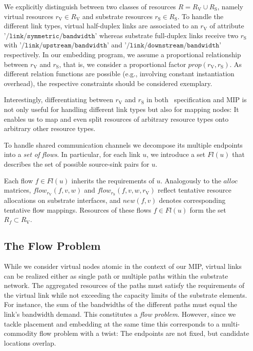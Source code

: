 \documentclass[conference,10pt]{IEEEtran}
\newcommand{\CloudNet}{\text{CloudNet}}
\newcommand{\mrm}{\mathrm}
\begin{document}
We explicitly distinguish between two classes
of resources $R=R_\mrm{V}\cup R_\mrm{S}$, namely virtual
resources $r_\mrm{V}\in R_\mrm{V}$ and substrate resources
$r_\mrm{S} \in R_\mrm{S}$.
To handle the different link types, virtual half-duplex links are associated to an $r_\mrm{V}$ of attribute
$\texttt{'/link}$$\texttt{/symmetric}$$\texttt{/bandwidth'}$
whereas substrate full-duplex links receive two $r_\mrm{S}$ with
$\texttt{'/link}$$\texttt{/upstream}$$\texttt{/bandwidth'}$ and
$\texttt{'/link}$$\texttt{/downstream}$$\texttt{/bandwidth'}$ respectively.
In our embedding program, we
assume a proportional relationship between $r_\mrm{V}$ and $r_\mrm{S}$, that is,
we consider a proportional factor $prop(r_\mrm{V},r_\mrm{S})$.
As different relation functions are possible (e.g., involving constant instantiation overhead), the respective constraints should be considered exemplary.

Interestingly, differentiating between $r_\mrm{V}$ and $r_\mrm{S}$ in both
\CloudNet\ specification and MIP is not only useful for
handling different link types but also for mapping nodes:
It enables us to map and even split resources of arbitrary resource types onto arbitrary other resource types.

To handle shared communication
channels we decompose its multiple endpoints into a \emph{set of
flows}. In particular, for each link $u$, we introduce a set $Fl(u)$
that describes the set of possible source-sink pairs for $u$.

Each flow $f\in Fl(u)$ inherits the requirements of $u$.
Analogously to the $alloc$ matrices, $flow_{r_\mrm{V}}(f,v,w)$ and $flow_{r_\mrm{S}}(f,v,w,r_\mrm{V})$ reflect tentative resource allocations on substrate interfaces,
and $new(f,v)$ denotes corresponding tentative flow mappings. Resources of these flows $f\in Fl(u)$ form the set $R_f \subset R_\mrm{V}$.

\subsection{The Flow Problem} \label{ssec:map:approach:flow}

While we consider virtual nodes atomic in the context of our MIP,
virtual links can be realized either as
single path or multiple paths within the substrate network. The
aggregated resources of the paths must satisfy the requirements of
the virtual link while not exceeding the capacity limits of the
substrate elements. For instance, the sum of the bandwidths of the
different paths must equal the link's bandwidth demand. This
constitutes a \emph{flow problem}. However, since we tackle
placement and embedding at the same time this corresponds to a
multi-commodity flow problem with a twist: The endpoints are not
fixed, but candidate locations overlap.
\end{document}

